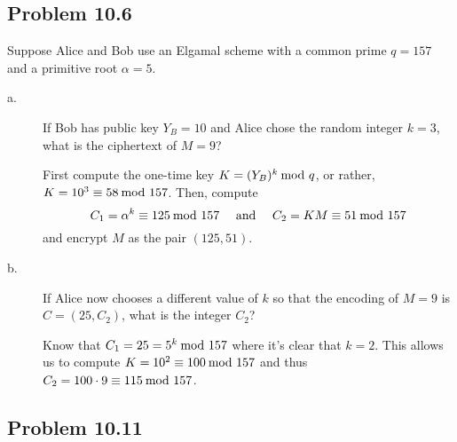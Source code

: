 \documentclass[../hw_sols.tex]{subfiles}
\begin{document}

\subsection*{Problem 10.6}

Suppose Alice and Bob use an Elgamal scheme with a common prime $q = 157$ and 
a primitive root $\alpha = 5$.

\begin{description}

\item[a.] If Bob has public key $Y_B = 10$ and Alice chose the random 
integer $k = 3$, what is the ciphertext of $M = 9$?

\begin{solution}
First compute the one-time key $K = (Y_B)^k \tmod{q}$, or rather, 
$K = 10^3 \equiv 58 \tmod{157}$. Then, compute
	\[ C_1 = \alpha^k \equiv 125 \tmod{157} 
	\quad \text{ and } \quad
	C_2 = KM \equiv 51 \tmod{157} \]
and encrypt $M$ as the pair $(125, 51)$.
\end{solution}

\item[b.] If Alice now chooses a different value of $k$ so that the encoding 
of $M = 9$ is $C = (25, C_2)$, what is the integer $C_2$?

\begin{solution}
Know that $C_1 = 25 = 5^k \tmod{157}$ where it's clear that $k = 2$. This 
allows us to compute \newline
$K = 10^2 \equiv 100 \tmod{157}$ and thus 
$C_2 = 100 \cdot 9 \equiv 115 \tmod{157}$.
\end{solution}

\end{description}


\newpage


\subsection*{Problem 10.11}
\end{document}
